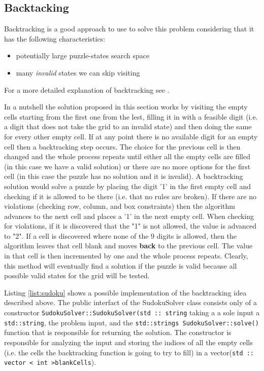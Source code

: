 \subsection{Backtacking}
\label{sudoku:sec:bruteforce}

Backtracking is a good approach to use to solve this problem considering that it
has the following characteristics:
\begin{itemize}
	\item potentially large puzzle-states search space
	\item many \textit{invalid} states we can skip visiting
\end{itemize}
For a more detailed explanation of backtracking see \cite{backtracking}.

In a nutshell the solution proposed in this section works by visiting the empty cells starting from
the first one from the lest, filling it in with a feasible digit (i.e. a digit that does not take the
grid to an invalid state) and then doing the same for every other empty cell. If at
any point there is no available digit for an empty cell then a backtracking step occurs. The
choice for the previous cell is then changed and the whole process repeats until either all the
empty cells are filled (in this case we have a valid solution) or there are no more options for the
first cell (in this case the puzzle has no solution and it is invalid). A backtracking solution
would solve a puzzle by placing the digit '1' in the first empty cell and checking if it is allowed
to be there  (i.e. that no rules are broken). If there are no violations (checking row, column, and box
constraints) then the algorithm advances to the next cell and places a '1' in the next empty cell.
When checking for violations, if it is discovered that the "1" is not allowed, the value is advanced
to "2". If a cell is discovered where none of the 9 digits is allowed, then the algorithm leaves
that cell blank and moves \textbf{back} to the previous cell. The value in that cell is then
incremented by one and the whole process repeats. Clearly, this method will eventually find a
solution if the puzzle is valid because all possible valid states for the grid will be tested. 


Listing \ref{list:sudoku} shows a possible implementation of the backtracking idea described above.
The public interfact of the SudokuSolver class consists only of a constructor
\lstinline[columns=fixed]{SudokuSolver::SudokuSolver(std :: string} taking a a sole input a
\lstinline[columns=fixed]{std::string}, the problem input, and the
\lstinline[columns=fixed]{std::strings SudokuSolver::solve()} function that is responsible for
returning the solution. The constructor is responsible for analyzing the input and storing the indices of all the empty
cells (i.e. the cells the backtracking function is going to try to fill) in a
vector(\lstinline[columns=fixed]{std :: vector < int >blankCells}).

